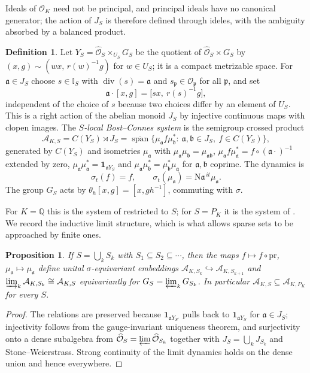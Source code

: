 \documentclass[11pt]{amsart}
\numberwithin{equation}{section}
\newtheorem{proposition}[theorem]{Proposition}
\theoremstyle{definition}
\newtheorem{definition}[theorem]{Definition}
\theoremstyle{remark}
\newcommand{\Q}{\mathbb{Q}}
\newcommand{\Ns}{\mathrm{N}}
\newcommand{\OK}{\mathcal{O}_K}
\newcommand{\cA}{\mathcal{A}}
\newcommand{\cO}{\mathcal{O}}
\newcommand{\Idl}{\mathbb{I}}
\newcommand{\pp}{\mathfrak{p}}
\newcommand{\aaa}{\mathfrak{a}}
\newcommand{\bb}{\mathfrak{b}}
\newcommand{\spn}{\operatorname{span}}
\newcommand{\hOS}{\widehat{\cO}_S}
\begin{document}
Ideals of $\OK$ need not be principal, and principal ideals have no canonical
generator; the action of $J_S$ is therefore defined through ideles, with the
ambiguity absorbed by a balanced product.

\begin{definition}\label{def:system}
Let $Y_S=\hOS\times_{U_S}G_S$ be the quotient of $\hOS\times G_S$ by
$(x,g)\sim(wx,\,r(w)^{-1}g)$ for $w\in U_S$; it is a compact metrizable space.
For $\aaa\in J_S$ choose $s\in\Idl_S$ with $\operatorname{div}(s)=\aaa$ and
$s_\pp\in\cO_\pp$ for all $\pp$, and set
\[
\aaa\cdot[x,g]=\bigl[sx,\ r(s)^{-1}g\bigr],
\]
independent of the choice of $s$ because two choices differ by an element of
$U_S$. This is a right action of the abelian monoid $J_S$ by injective
continuous maps with clopen images. The \emph{$S$-local Bost--Connes system} is
the semigroup crossed product
\[
\cA_{K,S}=C(Y_S)\rtimes J_S=\overline{\spn}\bigl\{\mu_\aaa f\mu_\bb^*:\ \aaa,\bb\in J_S,\ f\in C(Y_S)\bigr\},
\]
generated by $C(Y_S)$ and isometries $\mu_\aaa$ with
$\mu_\aaa\mu_\bb=\mu_{\aaa\bb}$, $\mu_\aaa f\mu_\aaa^*=f\circ(\aaa\cdot)^{-1}$
extended by zero, $\mu_\aaa\mu_\aaa^*=\mathbf 1_{\aaa Y_S}$ and
$\mu_\aaa\mu_\bb^*=\mu_\bb^*\mu_\aaa$ for $\aaa,\bb$ coprime. The dynamics is
\[
\sigma_t(f)=f,\qquad\sigma_t(\mu_\aaa)=\Ns\aaa^{\,it}\mu_\aaa .
\]
The group $G_S$ acts by $\theta_h[x,g]=[x,gh^{-1}]$, commuting with $\sigma$.
\end{definition}

For $K=\Q$ this is the system of \cite{LR} restricted to $S$; for $S=P_K$ it is
the system of \cite{HP,LLN}. We record the inductive limit structure, which is
what allows sparse sets to be approached by finite ones.

\begin{proposition}\label{prop:indlim}
If $S=\bigcup_kS_k$ with $S_1\subseteq S_2\subseteq\cdots$, then the maps
$f\mapsto f\circ\mathrm{pr}$, $\mu_\aaa\mapsto\mu_\aaa$ define unital
$\sigma$-equivariant embeddings $\cA_{K,S_k}\hookrightarrow\cA_{K,S_{k+1}}$ and
$\varinjlim_k\cA_{K,S_k}\cong\cA_{K,S}$ equivariantly for
$G_S=\varprojlim_kG_{S_k}$. In particular $\cA_{K,S}\subseteq\cA_{K,P_K}$ for
every $S$.
\end{proposition}

\begin{proof}
The relations are preserved because $\mathbf 1_{\aaa Y_{S'}}$ pulls back to
$\mathbf 1_{\aaa Y_S}$ for $\aaa\in J_S$; injectivity follows from the
gauge-invariant uniqueness theorem, and surjectivity onto a dense subalgebra
from $\hOS=\varprojlim\widehat{\cO}_{S_k}$ together with
$J_S=\bigcup_kJ_{S_k}$ and Stone--Weierstrass. Strong continuity of the limit
dynamics holds on the dense union and hence everywhere.
\end{proof}
\end{document}
